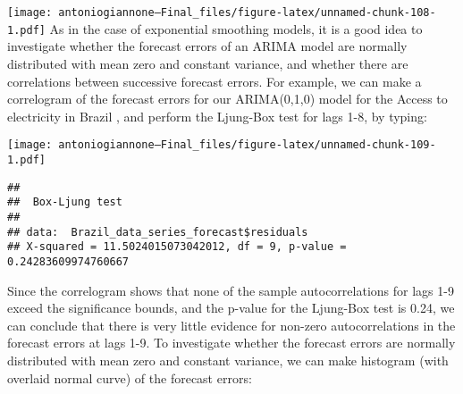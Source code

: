 \documentclass[
]{article}
\newenvironment{Shaded}{\begin{snugshade}}{\end{snugshade}}
\newcommand{\AttributeTok}[1]{\textcolor[rgb]{0.13,0.29,0.53}{#1}}
\newcommand{\DecValTok}[1]{\textcolor[rgb]{0.00,0.00,0.81}{#1}}
\newcommand{\FunctionTok}[1]{\textcolor[rgb]{0.13,0.29,0.53}{\textbf{#1}}}
\newcommand{\NormalTok}[1]{#1}
\newcommand{\SpecialCharTok}[1]{\textcolor[rgb]{0.81,0.36,0.00}{\textbf{#1}}}
\newcommand{\StringTok}[1]{\textcolor[rgb]{0.31,0.60,0.02}{#1}}
\begin{document}
\texttt{[image: antoniogiannone---Final\_files/figure-latex/unnamed-chunk-108-1.pdf]}
As in the case of exponential smoothing models, it is a good idea to
investigate whether the forecast errors of an ARIMA model are normally
distributed with mean zero and constant variance, and whether there are
correlations between successive forecast errors. For example, we can
make a correlogram of the forecast errors for our ARIMA(0,1,0) model for
the Access to electricity in Brazil , and perform the Ljung-Box test for
lags 1-8, by typing:

\begin{Shaded}
\end{Shaded}

\texttt{[image: antoniogiannone---Final\_files/figure-latex/unnamed-chunk-109-1.pdf]}

\begin{Shaded}
\end{Shaded}

\begin{verbatim}
## 
##  Box-Ljung test
## 
## data:  Brazil_data_series_forecast$residuals
## X-squared = 11.5024015073042012, df = 9, p-value = 0.24283609974760667
\end{verbatim}

Since the correlogram shows that none of the sample autocorrelations for
lags 1-9 exceed the significance bounds, and the p-value for the
Ljung-Box test is 0.24, we can conclude that there is very little
evidence for non-zero autocorrelations in the forecast errors at lags
1-9. To investigate whether the forecast errors are normally distributed
with mean zero and constant variance, we can make histogram (with
overlaid normal curve) of the forecast errors:

\begin{Shaded}
\end{Shaded}
\end{document}

